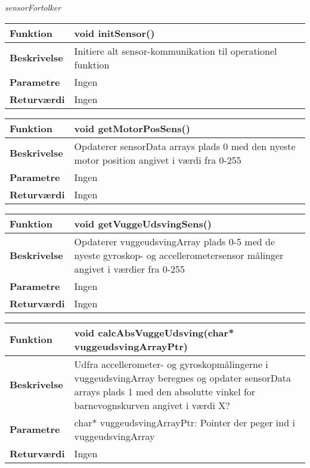 \textit{sensorFortolker} \\

\begin{center}
    \begin{tabular}{ | l | p{10cm} |}
    \hline
    \textbf{Funktion}	 	& void initSensor()									\\ \hline
    \textbf{Beskrivelse} 	& Initiere alt sensor-kommunikation til operationel funktion	\\ \hline
    \textbf{Parametre}		& Ingen			 										\\ \hline
    \textbf{Returværdi} 	& Ingen		 											\\ \hline
    \end{tabular}
\end{center}

\begin{center}
    \begin{tabular}{ | l | p{10cm} |}
    \hline
    \textbf{Funktion}	 	& void getMotorPosSens()								\\ \hline
    \textbf{Beskrivelse} 	& Opdaterer sensorData arrays plads 0 med den nyeste motor position angivet i værdi fra 0-255					\\ \hline
    \textbf{Parametre}		& Ingen								 		\\ \hline
    \textbf{Returværdi} 	& Ingen		 												\\ \hline
    \end{tabular}
\end{center}

\begin{center}
    \begin{tabular}{ | l | p{10cm} |}
    \hline
    \textbf{Funktion}	 	& void getVuggeUdsvingSens()										\\ \hline
    \textbf{Beskrivelse} 	& Opdaterer vuggeudsvingArray plads 0-5 med de nyeste gyroskop- og accellerometersensor målinger angivet i værdier fra 0-255		\\ \hline
    \textbf{Parametre}		& Ingen			 										\\ \hline
    \textbf{Returværdi} 	& Ingen		 											\\ \hline
    \end{tabular}
\end{center}

\begin{center}
    \begin{tabular}{ | l | p{10cm} |}
    \hline
    \textbf{Funktion}	 	& void calcAbsVuggeUdsving(char* vuggeudsvingArrayPtr)										\\ \hline
    \textbf{Beskrivelse} 	& Udfra accellerometer- og gyroskopmålingerne i vuggeudsvingArray beregnes og opdater sensorData arrays plads 1 med den absolutte vinkel for barnevognskurven angivet i værdi X? 		\\ \hline
    \textbf{Parametre}		& char* vuggeudsvingArrayPtr: Pointer der peger ind i vuggeudsvingArray 		\\ \hline
    \textbf{Returværdi} 	& Ingen			\\ \hline
    \end{tabular}
\end{center}

